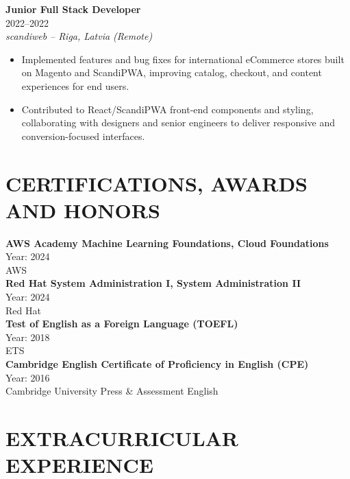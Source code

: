 \documentclass[a4paper,9pt]{extarticle}
\begin{document}
\noindent
\textbf{Junior Full Stack Developer} \\
2022--2022 \\
\textit{scandiweb -- Riga, Latvia (Remote)}
\begin{itemize}[leftmargin=*]
\item Implemented features and bug fixes for international eCommerce stores built on Magento and ScandiPWA, improving catalog, checkout, and content experiences for end users.
\item Contributed to React/ScandiPWA front-end components and styling, collaborating with designers and senior engineers to deliver responsive and conversion-focused interfaces. \\
\end{itemize}


\section*{CERTIFICATIONS, AWARDS AND HONORS}

\noindent
\textbf{AWS Academy Machine Learning Foundations, Cloud Foundations} \\
Year: 2024 \\
AWS \\

\noindent
\textbf{Red Hat System Administration I, System Administration II} \\
Year: 2024 \\
Red Hat \\

\noindent
\textbf{Test of English as a Foreign Language (TOEFL)} \\
Year: 2018 \\
ETS \\

\noindent
\textbf{Cambridge English Certificate of Proficiency in English (CPE)} \\
Year: 2016 \\
Cambridge University Press \& Assessment English


\section*{EXTRACURRICULAR EXPERIENCE}
\end{document}
